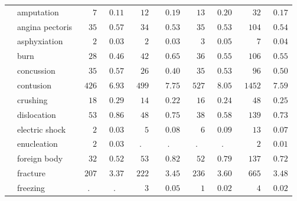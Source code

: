 \documentclass[9pt, oneside]{article}   	%
\begin{document}
\begin{longtable}{p{1.8in}p{2.2in}cccccccc}
 & amputation  & $\phantom{000}7$ & $\phantom{0}0.11$ & $\phantom{00}12$ & $\phantom{00}0.19$ & $\phantom{00}13$ & $\phantom{0}0.20$ & $\phantom{000}32$ & $\phantom{0}0.17$ \\
 & angina pectoris  & $\phantom{00}35$ & $\phantom{0}0.57$ & $\phantom{00}34$ & $\phantom{00}0.53$ & $\phantom{00}35$ & $\phantom{0}0.53$ & $\phantom{00}104$ & $\phantom{0}0.54$ \\
 & asphyxiation  & $\phantom{000}2$ & $\phantom{0}0.03$ & $\phantom{000}2$ & $\phantom{00}0.03$ & $\phantom{000}3$ & $\phantom{0}0.05$ & $\phantom{0000}7$ & $\phantom{0}0.04$ \\
 & burn  & $\phantom{00}28$ & $\phantom{0}0.46$ & $\phantom{00}42$ & $\phantom{00}0.65$ & $\phantom{00}36$ & $\phantom{0}0.55$ & $\phantom{00}106$ & $\phantom{0}0.55$ \\
 & concussion  & $\phantom{00}35$ & $\phantom{0}0.57$ & $\phantom{00}26$ & $\phantom{00}0.40$ & $\phantom{00}35$ & $\phantom{0}0.53$ & $\phantom{000}96$ & $\phantom{0}0.50$ \\
 & contusion  & $\phantom{0}426$ & $\phantom{0}6.93$ & $\phantom{0}499$ & $\phantom{00}7.75$ & $\phantom{0}527$ & $\phantom{0}8.05$ & $\phantom{0}1452$ & $\phantom{0}7.59$ \\
 & crushing  & $\phantom{00}18$ & $\phantom{0}0.29$ & $\phantom{00}14$ & $\phantom{00}0.22$ & $\phantom{00}16$ & $\phantom{0}0.24$ & $\phantom{000}48$ & $\phantom{0}0.25$ \\
 & dislocation  & $\phantom{00}53$ & $\phantom{0}0.86$ & $\phantom{00}48$ & $\phantom{00}0.75$ & $\phantom{00}38$ & $\phantom{0}0.58$ & $\phantom{00}139$ & $\phantom{0}0.73$ \\
 & electric shock  & $\phantom{000}2$ & $\phantom{0}0.03$ & $\phantom{000}5$ & $\phantom{00}0.08$ & $\phantom{000}6$ & $\phantom{0}0.09$ & $\phantom{000}13$ & $\phantom{0}0.07$ \\
 & enucleation  & $\phantom{000}2$ & $\phantom{0}0.03$ & . & . & . & . & $\phantom{0000}2$ & $\phantom{0}0.01$ \\
 & foreign body  & $\phantom{00}32$ & $\phantom{0}0.52$ & $\phantom{00}53$ & $\phantom{00}0.82$ & $\phantom{00}52$ & $\phantom{0}0.79$ & $\phantom{00}137$ & $\phantom{0}0.72$ \\
 & fracture  & $\phantom{0}207$ & $\phantom{0}3.37$ & $\phantom{0}222$ & $\phantom{00}3.45$ & $\phantom{0}236$ & $\phantom{0}3.60$ & $\phantom{00}665$ & $\phantom{0}3.48$ \\
 & freezing  & . & . & $\phantom{000}3$ & $\phantom{00}0.05$ & $\phantom{000}1$ & $\phantom{0}0.02$ & $\phantom{0000}4$ & $\phantom{0}0.02$ \\

\end{longtable}
\end{document}

